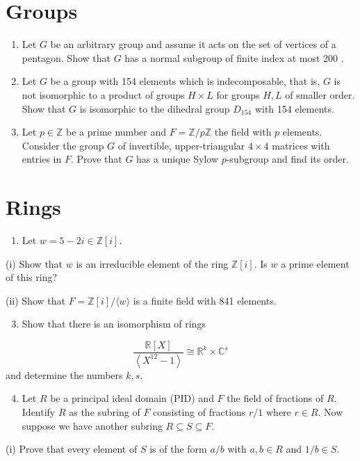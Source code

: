 \documentclass[10pt]{article}
\begin{document}
\section{Groups}
\begin{enumerate}
  \item Let $G$ be an arbitrary group and assume it acts on the set of vertices of a pentagon. Show that $G$ has a normal subgroup of finite index at most 200 .

  \item Let $G$ be a group with 154 elements which is indecomposable, that is, $G$ is not isomorphic to a product of groups $H \times L$ for groups $H, L$ of smaller order. Show that $G$ is isomorphic to the dihedral group $D_{154}$ with 154 elements.

  \item Let $p \in \mathbb{Z}$ be a prime number and $F=\mathbb{Z} / p \mathbb{Z}$ the field with $p$ elements. Consider the group $G$ of invertible, upper-triangular $4 \times 4$ matrices with entries in $F$. Prove that $G$ has a unique Sylow $p$-subgroup and find its order.

\end{enumerate}
\section{Rings}
\begin{enumerate}
  \item Let $w=5-2 i \in \mathbb{Z}[i]$.
\end{enumerate}
(i) Show that $w$ is an irreducible element of the ring $\mathbb{Z}[i]$. Is $w$ a prime element of this ring?

(ii) Show that $F=\mathbb{Z}[i] /\langle w\rangle$ is a finite field with 841 elements.

\begin{enumerate}
  \setcounter{enumi}{2}
  \item Show that there is an isomorphism of rings
\end{enumerate}
$$
\frac{\mathbb{R}[X]}{\left\langle X^{12}-1\right\rangle} \cong \mathbb{R}^{k} \times \mathbb{C}^{s}
$$
and determine the numbers $k, s$.

\begin{enumerate}
  \setcounter{enumi}{3}
  \item Let $R$ be a principal ideal domain (PID) and $F$ the field of fractions of $R$. Identify $R$ as the subring of $F$ consisting of fractions $r / 1$ where $r \in R$. Now suppose we have another subring $R \subseteq S \subseteq F$.
\end{enumerate}
(i) Prove that every element of $S$ is of the form $a / b$ with $a, b \in R$ and $1 / b \in S$.
\end{document}
